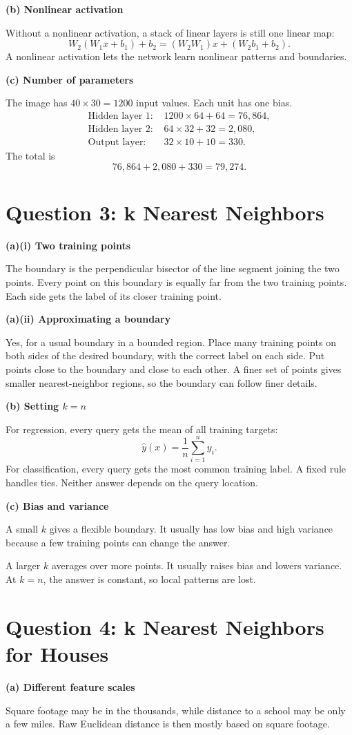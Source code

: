 \documentclass[11pt]{article}
\newcommand{\parttitle}[1]{\par\textbf{#1}\par}
\begin{document}
\parttitle{(b) Nonlinear activation}
Without a nonlinear activation, a stack of linear layers is still one linear map:
\[
W_2(W_1x+b_1)+b_2=(W_2W_1)x+(W_2b_1+b_2).
\]
A nonlinear activation lets the network learn nonlinear patterns and boundaries.

\parttitle{(c) Number of parameters}
The image has $40\times30=1200$ input values. Each unit has one bias.
\begin{align*}
\text{Hidden layer 1: }&1200\times64+64=76{,}864,\\
\text{Hidden layer 2: }&64\times32+32=2{,}080,\\
\text{Output layer: }&32\times10+10=330.
\end{align*}
The total is
\[
\boxed{76{,}864+2{,}080+330=79{,}274}.
\]

\newpage
\section*{Question 3: k Nearest Neighbors}
\parttitle{(a)(i) Two training points}
The boundary is the perpendicular bisector of the line segment joining the two points. Every point on this boundary is equally far from the two training points. Each side gets the label of its closer training point.

\parttitle{(a)(ii) Approximating a boundary}
Yes, for a usual boundary in a bounded region. Place many training points on both sides of the desired boundary, with the correct label on each side. Put points close to the boundary and close to each other. A finer set of points gives smaller nearest-neighbor regions, so the boundary can follow finer details.

\parttitle{(b) Setting $k=n$}
For regression, every query gets the mean of all training targets:
\[
\hat y(x)=\frac{1}{n}\sum_{i=1}^{n}y_i.
\]
For classification, every query gets the most common training label. A fixed rule handles ties. Neither answer depends on the query location.

\parttitle{(c) Bias and variance}
A small $k$ gives a flexible boundary. It usually has low bias and high variance because a few training points can change the answer.

A larger $k$ averages over more points. It usually raises bias and lowers variance. At $k=n$, the answer is constant, so local patterns are lost.

\newpage
\section*{Question 4: k Nearest Neighbors for Houses}
\parttitle{(a) Different feature scales}
Square footage may be in the thousands, while distance to a school may be only a few miles. Raw Euclidean distance is then mostly based on square footage.
\end{document}
